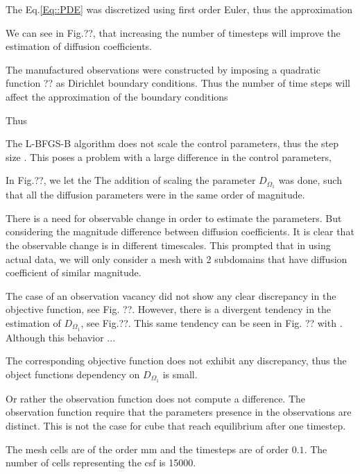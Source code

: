 \documentclass[11pt,a4paper]{article}
\begin{document}
 
The Eq.\ref{Eq::PDE} was discretized using first order Euler, thus the approximation  




We can see in Fig.??, that increasing the number of timesteps will improve the estimation of diffusion coefficients. 


The manufactured observations were constructed by imposing a quadratic function ?? as Dirichlet boundary conditions. Thus the number of time steps will affect the approximation of the boundary conditions


Thus 

The L-BFGS-B algorithm does not scale the control parameters, thus the step size . This poses a problem with a large difference in the control parameters, 




In Fig.??, we let the 
The addition of scaling the parameter $D_{\Omega_1}$ was done, such that all the diffusion parameters were in the same order of magnitude.   



There is a need for observable change in order to estimate the parameters. But considering the magnitude difference between diffusion coefficients. It is clear that the observable change is in different timescales. This prompted that in using actual data, we will only consider a mesh with 2 subdomains that have diffusion coefficient of similar magnitude.   



The case of an observation vacancy did not show any clear discrepancy in the objective function, see Fig. ??. However, there is a divergent tendency in the estimation of $D_{\Omega_1}$, see Fig.??. This same tendency can be seen in Fig. ?? with . Although this behavior  ... 


The corresponding objective function does not exhibit any discrepancy, thus the object functions dependency on $D_{\Omega_1}$ is small. 

Or rather the observation function does not compute a difference. The observation function require that the parameters presence in the observations are distinct. This is not the case for cube that reach equilibrium after one timestep. 

The mesh cells are of the order $\mathrm{mm}$ and the timesteps are of order $0.1$. The number of cells representing the csf is 15000.    
  






\end{document}
